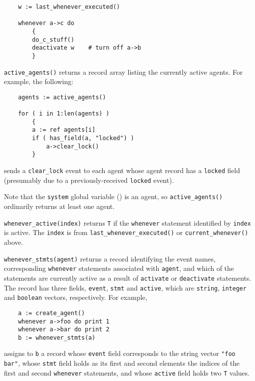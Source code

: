 \begin{sloppy}
\begin{list}{}{}
\begin{verbatim}
    w := last_whenever_executed()

    whenever a->c do
        {
        do_c_stuff()
        deactivate w    # turn off a->b
        }
\end{verbatim}

\item[{\tt active\_agents()}] \label{active_agents-func}
returns a record array listing the currently active agents.  For example,
the following:
\begin{verbatim}
    agents := active_agents()

    for ( i in 1:len(agents) )
        {
        a := ref agents[i]
        if ( has_field(a, "locked") )
            a->clear_lock()
        }
\end{verbatim}
sends a {\tt clear\_lock} event to each agent whose agent record
has a {\tt locked} field (presumably due to a previously-received
{\tt locked} event).

Note that the {\tt system} global variable () is an
agent, so {\tt active\_agents()} ordinarily returns at least one agent.

\item[{\tt whenever\_active(index)}] \label{whenever_active-func}
returns {\tt T} if the {\tt whenever} statement identified by {\tt index}
is active. The {\tt index} is from {\tt last\_whenever\_executed()} or
{\tt current\_whenever()} above.

\item[{\tt whenever\_stmts(agent)}] \label{whenever_stmts-func}
returns a record identifying the event names, corresponding
{\tt whenever} statements associated with {\tt agent}, and which of
the statements are currently active as a result of {\tt activate} or
{\tt deactivate} statements.  The record has three fields, {\tt event},
{\tt stmt} and {\tt active}, which are {\tt string}, {\tt integer} and
{\tt boolean} vectors, respectively.
For example,
\begin{verbatim}
    a := create_agent()
    whenever a->foo do print 1
    whenever a->bar do print 2
    b := whenever_stmts(a)
\end{verbatim}
assigns to {\tt b} a record whose {\tt event} field corresponds to
the string vector {\tt "foo bar"}, whose {\tt stmt} field holds
as its first and second elements the indices of the first and second
{\tt whenever} statements, and whose {\tt active} field holds two
{\tt T} values.


\end{list}
\end{sloppy}
